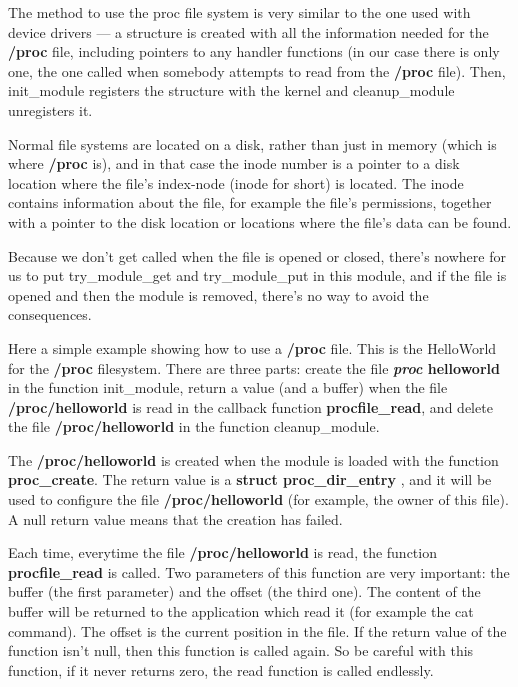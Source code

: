 \documentclass[10pt, oneside]{book}
\begin{document}
The method to use the proc file system is very similar to the one used with device drivers --- a structure is created with all the information needed for the \textbf{/proc} file, including pointers to any handler functions (in our case there is only one, the one called when somebody attempts to read from the \textbf{/proc} file). Then, init\_module registers the structure with the kernel and cleanup\_module unregisters it.

Normal file systems are located on a disk, rather than just in memory (which is where \textbf{/proc} is), and in that case the inode number is a pointer to a disk location where the file's index-node (inode for short) is located. The inode contains information about the file, for example the file's permissions, together with a pointer to the disk location or locations where the file's data can be found.

Because we don't get called when the file is opened or closed, there's nowhere for us to put try\_module\_get and try\_module\_put in this module, and if the file is opened and then the module is removed, there's no way to avoid the consequences.

Here a simple example showing how to use a \textbf{/proc} file. This is the HelloWorld for the \textbf{/proc} filesystem. There are three parts: create the file \textbf{\emph{proc} helloworld} in the function init\_module, return a value (and a buffer) when the file \textbf{/proc/helloworld} is read in the callback function \textbf{procfile\_read}, and delete the file \textbf{/proc/helloworld} in the function cleanup\_module.

The \textbf{/proc/helloworld} is created when the module is loaded with the function \textbf{proc\_create}. The return value is a \textbf{struct proc\_dir\_entry} , and it will be used to configure the file \textbf{/proc/helloworld} (for example, the owner of this file). A null return value means that the creation has failed.

Each time, everytime the file \textbf{/proc/helloworld} is read, the function \textbf{procfile\_read} is called. Two parameters of this function are very important: the buffer (the first parameter) and the offset (the third one). The content of the buffer will be returned to the application which read it (for example the cat command). The offset is the current position in the file. If the return value of the function isn't null, then this function is called again. So be careful with this function, if it never returns zero, the read function is called endlessly.
\end{document}
